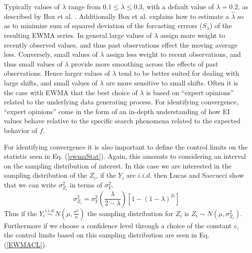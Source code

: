 \documentclass[12pt]{article}
\newcommand{\E}[1]{
        \mathbb{E}\left[~#1~\right]
}
\def \ix {
	\text{I}(\bm{x})
}
\begin{document}
	Typically values of $\lambda$ range from $0.1\le\lambda\le0.3$, with a default value of $\lambda=0.2$, as described by Box et al. \cite{boxBook}.
	Additionally Box et al. explains how to estimate a $\hat\lambda$ so as to minimize sum of squared deviation of the forcasting errrors ($S_\lambda$) of the resulting EWMA series. %
	In general large values of $\lambda$ assign more weight to recently observed values, and thus past observations effect the moving average less. %
	Conversely, small values of $\lambda$ assign less weight to recent observations, and thus small values of $\lambda$ provide more smoothing across the effects of past observations. 
	Hence larger values of $\lambda$ tend to be better suited for dealing with large shifts, and small values of $\lambda$ are more sensitive to small shifts.
	Often it is the case with EWMA that the best choice of $\lambda$ is based on ``expert opinions'' related to the underlying data generating process.
	For identifying convergence, ``expert opinions'' come in the form of an in-depth understanding of how EI values behave relative to the specific search phenomena related to the expected behavior of $f$.
	
	
	
	For identifying convergence it is also important to define the control limits on the statistic seen in Eq. (\ref{ewmaStat}).
	Again, this amounts to considering an interval on the sampling distribution of interest.
	In this case we are interested in the sampling distribution of the $Z_i$, if the $Y_i$ are $i.i.d.$ then Lucas and Saccucci \cite{ewmaPaper}  show that we can write $\sigma^2_{Z_i}$ in terms of $\sigma^2_{Y}$. %
	\begin{equation}
	\sigma^2_{Z_i} = \sigma^2_{Y}\left(\frac{\lambda}{2-\lambda}\right)\left[1-(1-\lambda)^{2i}\right]
	\end{equation}
	Thus if the $Y_i \stackrel{i.i.d.}{\sim} N\left(\mu, \frac{\sigma^2}{n}\right)$ the sampling distribution for $Z_i$ is $Z_i \sim N\left(\mu, \sigma^2_{Z_i}\right)$.
	Furthermore if we choose a confidence level through a choice of the constant $c$, the control limits based on this sampling distribution are seen in Eq. (\ref{EWMACL}).%
	
\end{document}
